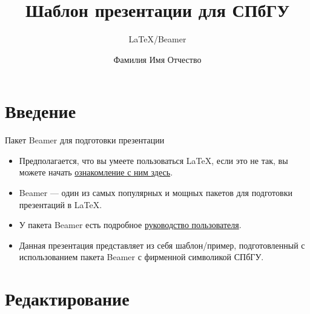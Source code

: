 \documentclass[10pt,aspectratio=169]{beamer}
\title{Шаблон презентации для СПбГУ}
\subtitle{\LaTeX/Beamer}
\author{Фамилия Имя Отчество}
\begin{document}
    \maketitle

    \section{Введение}

    \begin{frame}{Пакет Beamer для подготовки презентации}
        \begin{itemize}
            \item Предполагается, что вы умеете пользоваться \LaTeX, если это не так, вы можете начать
                \href{https://www.latex-project.org/}{ознакомление с ним здесь}.
            \item Beamer --- один из самых популярных и мощных пакетов для подготовки презентаций в \LaTeX.
            \item У пакета Beamer есть подробное
                \href{http://www.ctan.org/tex-archive/macros/latex/contrib/beamer/doc/beameruserguide.pdf}{руководство пользователя}.
            \item Данная презентация представляет из себя шаблон/пример, подготовленный с использованием пакета Beamer с фирменной символикой СПбГУ.
        \end{itemize}
    \end{frame}

    \section{Редактирование}

\end{document}
